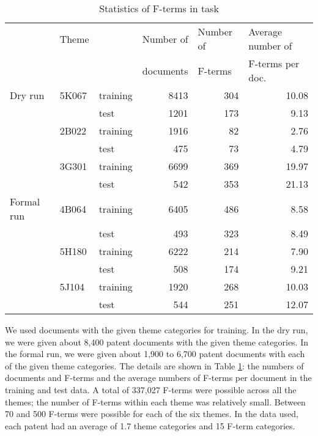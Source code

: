 \documentclass[english]{jnlp_1.2c}
\begin{document}
\begin{table}[t]
\caption{Statistics of F-terms in task}
\label{tab:stat-ft-ex}
\begin{center}
\begin{tabular}{|l|l|l|r|r|r|} \hline
\multicolumn{1}{|r|}{} & \multicolumn{1}{r|}{Theme} & \multicolumn{1}{r|}{} & \multicolumn{1}{l|}{Number of} & \multicolumn{1}{l|}{Number of} & \multicolumn{1}{l|}{Average number of} \\
\multicolumn{1}{|r|}{} & \multicolumn{1}{r|}{} & \multicolumn{1}{r|}{} & \multicolumn{1}{l|}{documents} & \multicolumn{1}{l|}{F-terms} & \multicolumn{1}{l|}{F-terms per doc.} \\\hline
Dry run & 5K067 & training & 8413 & 304 & 10.08 \\
 &  & test & 1201 & 173 & 9.13 \\\hline
 & 2B022 & training & 1916 & 82 & 2.76 \\
 &  & test & 475 & 73 & 4.79 \\\cline{2-6}
 & 3G301 & training & 6699 & 369 & 19.97 \\
 &  & test & 542 & 353 & 21.13 \\\cline{2-6}
Formal run & 4B064 & training & 6405 & 486 & 8.58 \\
 &  & test & 493 & 323 & 8.49 \\\cline{2-6}
 & 5H180 & training & 6222 & 214 & 7.90 \\
 &  & test & 508 & 174 & 9.21 \\\cline{2-6}
 & 5J104 & training & 1920 & 268 & 10.03 \\
 &  & test & 544 & 251 & 12.07 \\\hline
\end{tabular}
\end{center}
\end{table}

We used 
documents with the given theme categories for training. 
In the dry run, 
we were given about 8,400 patent documents with the given theme categories.
In the formal run, we were given about 1,900 to 6,700 patent documents 
with each of the given theme categories.
The details are shown in Table \ref{tab:stat-ft-ex}:
the numbers of documents
and F-terms
and the average numbers of F-terms per document 
in the training and 
test data. 
A total of 337,027 F-terms were possible across all the themes;
the number of F-terms within each theme was relatively small.
Between 70 and 500 F-terms  were possible for each of the six themes.
In the data used, 
each patent had an average of 1.7 theme categories
and 15 F-term categories.  
\end{document}
